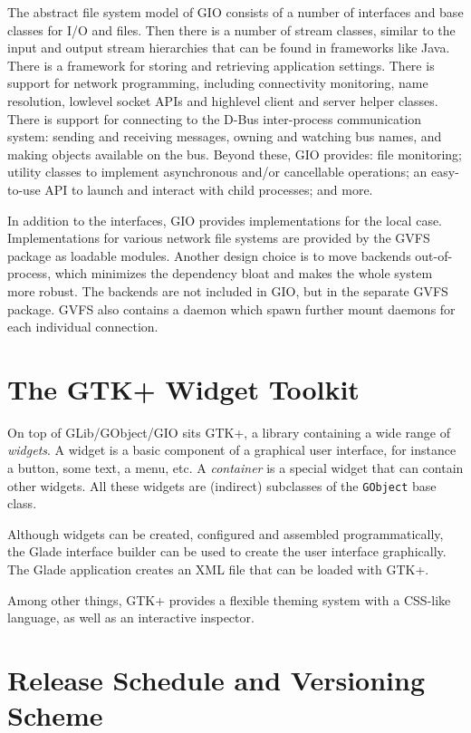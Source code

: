 \documentclass[a4paper,notumble]{leaflet}
\begin{document}
The abstract file system model of GIO consists of a number of interfaces and base classes for I/O and files. Then there is a number of stream classes, similar to the input and output stream hierarchies that can be found in frameworks like Java. There is a framework for storing and retrieving application settings. There is support for network programming, including connectivity monitoring, name resolution, lowlevel socket APIs and highlevel client and server helper classes. There is support for connecting to the D-Bus inter-process communication system: sending and receiving messages, owning and watching bus names, and making objects available on the bus. Beyond these, GIO provides: file monitoring; utility classes to implement asynchronous and/or cancellable operations; an easy-to-use API to launch and interact with child processes; and more.

In addition to the interfaces, GIO provides implementations for the local case. Implementations for various network file systems are provided by the GVFS package as loadable modules. Another design choice is to move backends out-of-process, which minimizes the dependency bloat and makes the whole system more robust. The backends are not included in GIO, but in the separate GVFS package. GVFS also contains a daemon which spawn further mount daemons for each individual connection.

\pagebreak
\section{The GTK+ Widget Toolkit}

On top of GLib/GObject/GIO sits GTK+, a library containing a wide range of \textit{widgets}. A widget is a basic component of a graphical user interface, for instance a button, some text, a menu, etc. A \textit{container} is a special widget that can contain other widgets. All these widgets are (indirect) subclasses of the \texttt{GObject} base class.

Although widgets can be created, configured and assembled programmatically, the Glade interface builder can be used to create the user interface graphically. The Glade application creates an XML file that can be loaded with GTK+.

Among other things, GTK+ provides a flexible theming system with a CSS-like language, as well as an interactive inspector.

\section{Release Schedule and Versioning Scheme}
\end{document}
